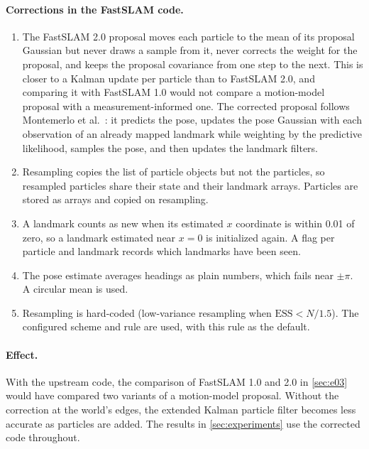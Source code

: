 \paragraph{Corrections in the FastSLAM code.}
\begin{enumerate}
  \item The FastSLAM 2.0 proposal moves each particle to the mean of its proposal Gaussian but never draws a sample from
        it, never corrects the weight for the proposal, and keeps the proposal covariance from one step to the next. This
        is closer to a Kalman update per particle than to FastSLAM 2.0, and comparing it with FastSLAM 1.0 would not compare
        a motion-model proposal with a measurement-informed one. The corrected proposal follows Montemerlo et al.\
        \cite{montemerlo2003fastslam2}: it predicts the pose, updates the pose Gaussian with each observation of an already
        mapped landmark while weighting by the predictive likelihood, samples the pose, and then updates the landmark filters.
  \item Resampling copies the list of particle objects but not the particles, so resampled particles share their state and
        their landmark arrays. Particles are stored as arrays and copied on resampling.
  \item A landmark counts as new when its estimated $x$ coordinate is within 0.01 of zero, so a landmark estimated near
        $x = 0$ is initialized again. A flag per particle and landmark records which landmarks have been seen.
  \item The pose estimate averages headings as plain numbers, which fails near $\pm\pi$. A circular mean is used.
  \item Resampling is hard-coded (low-variance resampling when $\mathrm{ESS} < N / 1.5$). The configured scheme and rule
        are used, with this rule as the default.
\end{enumerate}

\paragraph{Effect.} With the upstream code, the comparison of FastSLAM 1.0 and 2.0 in \cref{sec:e03} would have compared
two variants of a motion-model proposal. Without the correction at the world's edges, the extended Kalman particle filter
becomes less accurate as particles are added. The results in \cref{sec:experiments} use the corrected code throughout.
